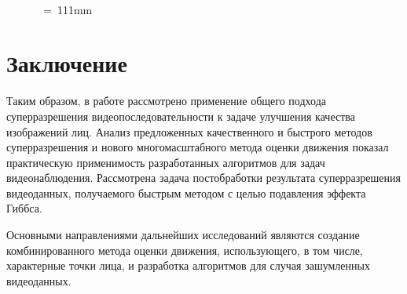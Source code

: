 \begin{multicols}{2}
\begin{figure*} %
\vspace*{1pt}
\begin{center}
\mbox{%
\epsfxsize=126.924mm
}
\end{center}
\vspace*{-9pt}
\end{figure*}


\begin{figure*} %
\vspace*{1pt}
\begin{center}
\mbox{%
\epsfxsize= 111mm %
}
\end{center}
\vspace*{-9pt}
\end{figure*}

     \section{Заключение}

     Таким образом, в работе рассмотрено применение общего подхода
суперразрешения видеопоследовательности к задаче улучшения качества изображений
лиц. Анализ предложенных качественного и быстрого методов суперразрешения и
нового многомасштабного метода оценки движения показал практическую
применимость разработанных алгоритмов для задач видеонаблюдения. Рассмотрена
задача постобработки результата суперразрешения видеоданных, получаемого
быстрым методом с \mbox{целью} подавления эффекта Гиббса.

     Основными направлениями дальнейших ис\-следований являются создание
комбинированного метода оценки движения, использующего, в том\linebreak
 чис\-ле, характерные
точки лица, и разработка алгоритмов для случая зашумленных видеоданных.


     {\small\frenchspacing
{%
\begin{thebibliography}{99}


\end{thebibliography}}}
\end{multicols}
